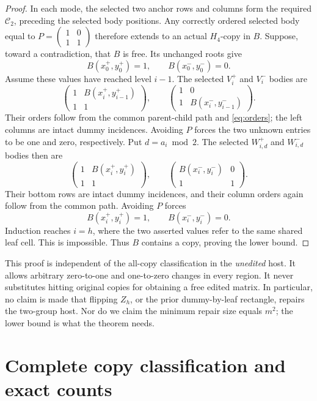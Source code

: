 \documentclass[11pt,a4paper]{article}
\theoremstyle{remark}
\newcommand{\crown}{\mathcal C}
\newcommand{\Hfour}{H_4}
\begin{document}
\begin{proof}
In each mode, the selected two anchor rows and columns form the
required \(\crown_2\), preceding the selected body positions.
Any correctly ordered selected body equal to
\(P=\left(\begin{smallmatrix}1&0\\1&1\end{smallmatrix}\right)\)
therefore extends to an actual \(\Hfour\)-copy in \(B\).
Suppose, toward a contradiction, that \(B\) is free.
Its unchanged roots give
\[
B(x_0^+,y_0^+)=1,\qquad B(x_0^-,y_0^-)=0.
\]
Assume these values have reached level \(i-1\).
The selected \(V_i^+\) and \(V_i^-\) bodies are
\[
\begin{pmatrix}1&B(x_i^+,y_{i-1}^+)\\1&1\end{pmatrix},
\qquad
\begin{pmatrix}1&0\\1&B(x_i^-,y_{i-1}^-)\end{pmatrix}.
\]
Their orders follow from the common parent-child path and
\eqref{eq:orders}; the left columns are intact dummy incidences.
Avoiding \(P\) forces the two unknown entries to be one and zero,
respectively. Put \(d=a_i\bmod2\). The selected \(W_{i,d}^+\)
and \(W_{i,d}^-\) bodies then are
\[
\begin{pmatrix}1&B(x_i^+,y_i^+)\\1&1\end{pmatrix},
\qquad
\begin{pmatrix}B(x_i^-,y_i^-)&0\\1&1\end{pmatrix}.
\]
Their bottom rows are intact dummy incidences, and their column
orders again follow from the common path. Avoiding \(P\) forces
\[
B(x_i^+,y_i^+)=1,\qquad B(x_i^-,y_i^-)=0.
\]
Induction reaches \(i=h\), where the two asserted values refer
to the same shared leaf cell. This is impossible. Thus \(B\)
contains a copy, proving the lower bound.
\end{proof}

This proof is independent of the all-copy classification in the
\emph{unedited} host. It allows arbitrary zero-to-one and one-to-zero
changes in every region. It never substitutes hitting original copies
for obtaining a free edited matrix. In particular, no claim is made
that flipping \(Z_h\), or the prior dummy-by-leaf rectangle, repairs
the two-group host. Nor do we claim the minimum repair size equals
\(m^2\); the lower bound is what the theorem needs.

\section{Complete copy classification and exact counts}
\label{sec:exact}
\end{document}
